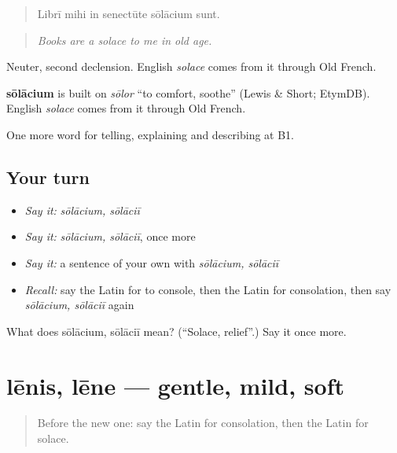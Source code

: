 \begin{quote}
Librī mihi in senectūte sōlācium sunt.
\end{quote}

\begin{quote}
\emph{Books are a solace to me in old age.}
\end{quote}

Neuter, second declension. English \emph{solace} comes from it through Old French.

\begin{cousinweb}
\textbf{sōlācium} is built on \emph{sōlor} \textquotedblleft{}to comfort, soothe\textquotedblright{} (Lewis \& Short; EtymDB). English \emph{solace} comes from it through Old French.
\end{cousinweb}

\begin{grammarlens}[title={What you've built}]
One more word for telling, explaining and describing at B1.
\end{grammarlens}

\subsection*{Your turn}
\begin{itemize}
\raggedright
  \item \emph{Say it:} \emph{sōlācium, sōlāciī}
  \item \emph{Say it:} \emph{sōlācium, sōlāciī}, once more
  \item \emph{Say it:} a sentence of your own with \emph{sōlācium, sōlāciī}
  \item \emph{Recall:} say the Latin for to console, then the Latin for consolation, then say \emph{sōlācium, sōlāciī} again
\end{itemize}

\begin{tcolorbox}[breakable,colback=teal!4,colframe=teal!35!black,title={Before you move on}]
What does sōlācium, sōlāciī mean? (\textquotedblleft{}Solace, relief\textquotedblright{}.) Say it once more.
\end{tcolorbox}
\section[lēnis, lēne]{lēnis, lēne — gentle, mild, soft}

\label{lesson:LA-C492-lenis}



\begin{quote}
Before the new one: say the Latin for consolation, then the Latin for solace.
\end{quote}

